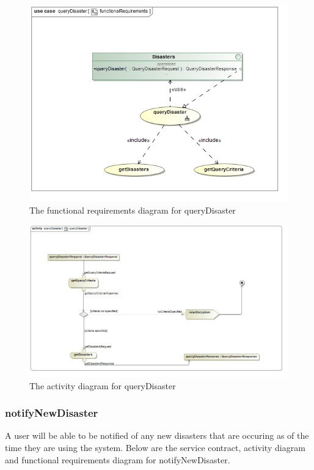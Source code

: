 \begin{figure}[H]
	\centering
	\includegraphics[width=1.0\textwidth]{../images/funcReq/queryDisasterFunctionalRequirements.jpg}
	\caption{The functional requirements diagram for queryDisaster \label{overflow}}
\end{figure}

\begin{figure}[H]
	\centering
	\includegraphics[width=1.0\textwidth]{../images/funcReq/queryDisasterActivityDiagram.jpg}
	\caption{The activity diagram for queryDisaster \label{overflow}}
\end{figure} 

\subsubsection{notifyNewDisaster}

A user will be able to be notified of any new disasters that are occuring as of the time they are using the system. Below are the service contract, activity diagram and functional requirements diagram for notifyNewDisaster.

